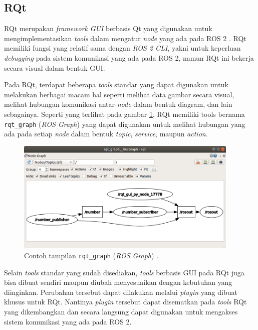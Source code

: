 \subsection{RQt}
\label{subsec:rqt}

RQt merupakan \emph{framework} \emph{GUI} berbasis Qt \citep{url:qtframework} yang digunakan untuk mengimplementasikan \emph{tools} dalam mengatur \emph{node} yang ada pada ROS 2 \citep{url:rqtoverview}.
RQt memiliki fungsi yang relatif sama dengan \emph{ROS 2 CLI},
  yakni untuk keperluan \emph{debugging} pada sistem komunikasi yang ada pada ROS 2,
  namun RQt ini bekerja secara visual dalam bentuk GUI.

Pada RQt, terdapat beberapa \emph{tools} standar yang dapat digunakan untuk melakukan berbagai macam hal seperti melihat data gambar secara visual,
  melihat hubungan komunikasi antar-\emph{node} dalam bentuk diagram,
  dan lain sebagainya.
Seperti yang terlihat pada gambar \ref{fig:contohrqtgraph},
  RQt memiliki tools bernama \lstinline{rqt_graph} (\emph{ROS Graph}) yang dapat digunakan untuk melihat hubungan yang ada pada setiap \emph{node} dalam bentuk \emph{topic}, \emph{service}, maupun \emph{action}.

\begin{figure}[ht]
  \centering
  \includegraphics[width=0.95\textwidth,keepaspectratio]{gambar/contoh-rqt-graph.png}
  \caption{Contoh tampilan \lstinline{rqt_graph} (\emph{ROS Graph}) \citep{url:rqtgraphexample}.}
  \label{fig:contohrqtgraph}
\end{figure}

Selain \emph{tools} standar yang sudah disediakan,
  \emph{tools} berbasis GUI pada RQt juga bisa dibuat sendiri maupun diubah menyesuaikan dengan kebutuhan yang diinginkan.
Perubahan tersebut dapat dilakukan melalui \emph{plugin} yang dibuat khusus untuk RQt.
Nantinya \emph{plugin} tersebut dapat disematkan pada \emph{tools} RQt yang dikembangkan dan secara langsung dapat digunakan untuk mengakses sistem komunikasi yang ada pada ROS 2.
